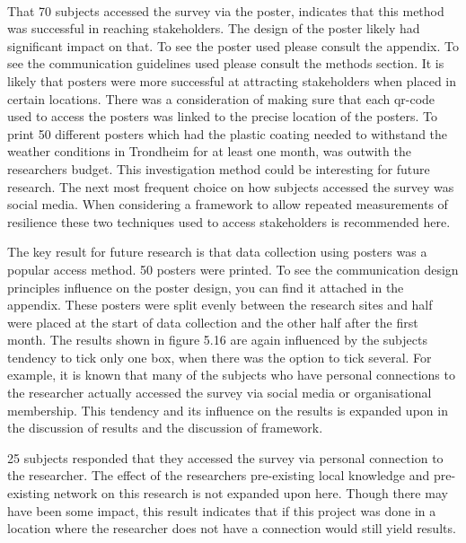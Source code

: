 \paragraph{}
That 70 subjects accessed the survey via the poster, indicates that this method was successful in reaching stakeholders. The design of the poster likely had significant impact on that. To see the poster used please consult the appendix. To see the communication guidelines used please consult the methods section. It is likely that posters were more successful at attracting stakeholders when placed in certain locations. There was a consideration of making sure that each qr-code used to access the posters was linked to the precise location of the posters. To print 50 different posters which had the plastic coating needed to withstand the weather conditions in Trondheim for at least one month, was outwith the researchers budget. This investigation method could be interesting for future research. The next most frequent choice on how subjects accessed the survey was social media. When considering a framework to allow repeated measurements of resilience these two techniques used to access stakeholders is recommended here. 



The key result for future research is that data collection using posters was a popular access method. 50 posters were printed. To see the communication design principles influence on the poster design, you can find it attached in the appendix. These posters were split evenly between the research sites and half were placed at the start of data collection and the other half after the first month. The results shown in figure 5.16 are again influenced by the subjects tendency to tick only one box, when there was the option to tick several. For example, it is known that many of the subjects who have personal connections to the researcher actually accessed the survey via social media or organisational membership. This tendency and its influence on the results is expanded upon in the discussion of results and the discussion of framework.



25 subjects responded that they accessed the survey via personal connection to the researcher. The effect of the researchers pre-existing local knowledge and pre-existing network on this research is not expanded upon here. Though there may have been some impact, this result indicates that if this project was done in a location where the researcher does not have a connection would still yield results.


